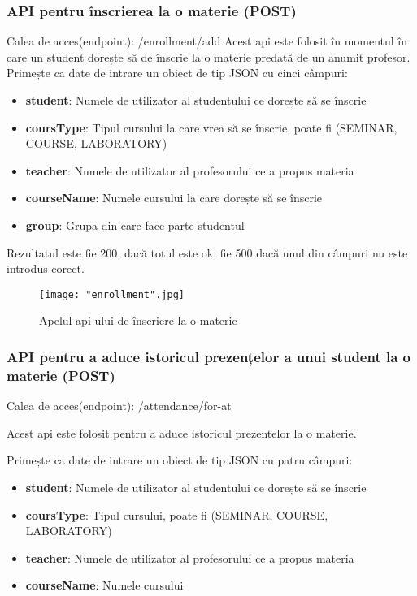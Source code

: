 \documentclass[a4paper, 12pt]{article}
\begin{document}
	\bigskip
	\subsubsection{API pentru înscrierea la o materie  (POST)} 
	\bigskip
	\quad\space\space Calea de acces(endpoint): /enrollment/add 
	Acest api este folosit în momentul în care un student dorește să de înscrie la o materie predată de un anumit profesor.
	\bigskip
	Primește ca date de intrare un obiect de tip JSON\textbf{\cite{bray2017javascript}} cu cinci câmpuri:
	\begin{itemize}
		\item \textbf{student}: Numele de utilizator al studentului ce dorește să se înscrie
		\item \textbf{coursType}: Tipul cursului la care vrea să se înscrie, poate fi (SEMINAR, COURSE, LABORATORY)
		\item \textbf{teacher}: Numele de utilizator al profesorului ce a propus materia
		\item \textbf{courseName}: Numele cursului la care dorește să se înscrie
		\item \textbf{group}: Grupa din care face parte studentul 
	\end{itemize}
	\quad Rezultatul este fie 200, dacă totul este ok, fie 500 dacă unul din câmpuri nu este introdus corect.
	\begin{figure}[!htb]
		\centering
		\texttt{[image: "enrollment".jpg]}
		\caption{Apelul api-ului de înscriere la o materie}\label{fig:enrollment}
	\end{figure}
	\bigskip
	
	\subsubsection{API pentru a aduce istoricul prezențelor a unui student la o materie (POST)} 
	
	\bigskip
	\quad\space\space Calea de acces(endpoint): /attendance/for-at 
	
	Acest api este folosit pentru a aduce istoricul prezentelor la o materie.
	
	\bigskip
	Primește ca date de intrare un obiect de tip JSON\textbf{\cite{bray2017javascript}} cu patru câmpuri:
	
	\begin{itemize}
		\item \textbf{student}: Numele de utilizator al studentului ce dorește să se înscrie
		\item \textbf{coursType}: Tipul cursului, poate fi (SEMINAR, COURSE, LABORATORY)
		\item \textbf{teacher}: Numele de utilizator al profesorului ce a propus materia
		\item \textbf{courseName}: Numele cursului
	\end{itemize}
	
\end{document}
